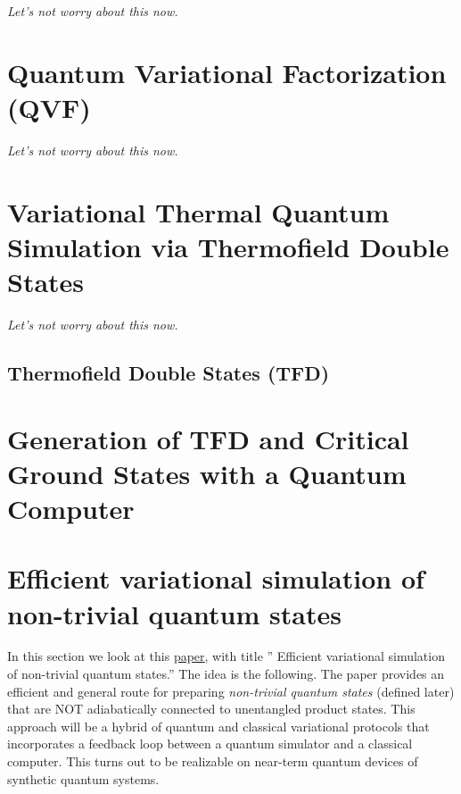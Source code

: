 \documentclass{book}
\theoremstyle{definition}
\begin{document}
\textit{Let's not worry about this now.}


\newpage

\section{Quantum Variational Factorization (QVF)}

\textit{Let's not worry about this now.}

\newpage



\section{Variational Thermal Quantum Simulation via Thermofield Double States}

\textit{Let's not worry about this now.}

\subsection{Thermofield Double States (TFD)}


\newpage



\section{Generation of TFD and Critical Ground States with a Quantum Computer }



\newpage






\section{Efficient variational simulation of non-trivial quantum states}

   
In this section we look at this \href{https://arxiv.org/pdf/1803.00026.pdf}{\underline{paper}}, with title '' Efficient variational simulation of non-trivial quantum states.'' The idea is the following. The paper provides an efficient and general route for preparing \textit{non-trivial quantum states} (defined later) that are NOT adiabatically connected to unentangled product states. This approach will be a hybrid of quantum and classical variational protocols that incorporates a feedback loop between a quantum simulator and a classical computer. This turns out to be realizable on near-term quantum devices of synthetic quantum systems. \\
\end{document}
